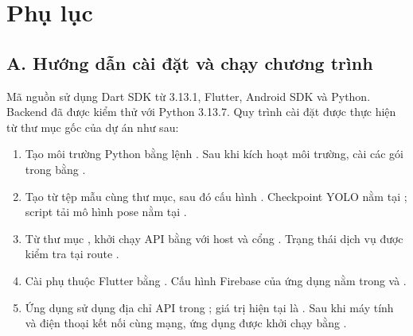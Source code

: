 \chapter{Phụ lục}

\section*{A. Hướng dẫn cài đặt và chạy chương trình}
{}

Mã nguồn sử dụng Dart SDK từ 3.13.1, Flutter, Android SDK và Python. Backend
đã được kiểm thử với Python 3.13.7. Quy trình cài đặt được thực hiện từ thư
mục gốc của dự án như sau:

\begin{enumerate}[leftmargin=1.8em, itemsep=4pt]
  \item Tạo môi trường Python bằng lệnh
        . Sau khi kích hoạt môi trường,
        cài các gói trong  bằng .
  \item Tạo  từ tệp mẫu cùng thư mục, sau đó cấu hình
        . Checkpoint YOLO nằm tại
        ; script tải mô hình pose nằm tại
        .
  \item Từ thư mục , khởi chạy API bằng
         với host  và cổng
        . Trạng thái dịch vụ được kiểm tra tại route
        .
  \item Cài phụ thuộc Flutter bằng . Cấu hình Firebase
        của ứng dụng nằm trong  và
        .
  \item Ứng dụng sử dụng địa chỉ API trong
        ; giá trị hiện tại là
        . Sau khi máy tính và điện thoại kết
        nối cùng mạng, ứng dụng được khởi chạy bằng .
\end{enumerate}

